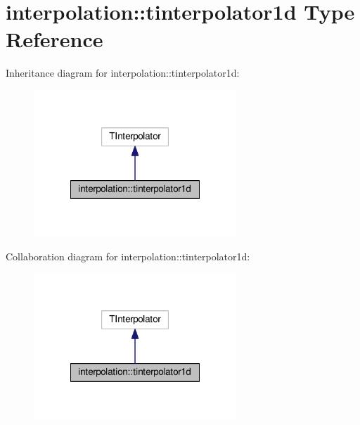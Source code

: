 \hypertarget{structinterpolation_1_1tinterpolator1d}{}\section{interpolation\+:\+:tinterpolator1d Type Reference}
\label{structinterpolation_1_1tinterpolator1d}


Inheritance diagram for interpolation\+:\+:tinterpolator1d\+:
\nopagebreak
\begin{figure}[H]
\begin{center}
\leavevmode
\includegraphics[width=216pt]{structinterpolation_1_1tinterpolator1d__inherit__graph}
\end{center}
\end{figure}


Collaboration diagram for interpolation\+:\+:tinterpolator1d\+:
\nopagebreak
\begin{figure}[H]
\begin{center}
\leavevmode
\includegraphics[width=216pt]{structinterpolation_1_1tinterpolator1d__coll__graph}
\end{center}
\end{figure}
